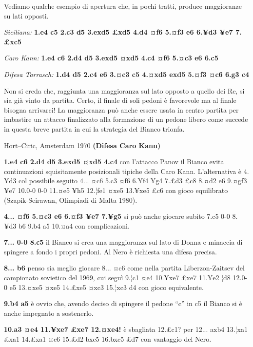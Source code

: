 Vediamo qualche esempio di apertura che, in pochi tratti, produce
maggioranze su lati opposti.

\emph{Siciliana:} \textbf{1.e4 c5 2.c3 d5 3.exd5 £xd5 4.d4 ¤f6 5.¤f3 e6
6.¥d3 ¥e7 7.£xc5}


\emph{Caro Kann:} \textbf{1.e4 c6 2.d4 d5 3.exd5 ¤xd5 4.c4 ¤f6 5.¤c3 e6
6.c5}


\emph{Difesa Tarrasch:} \textbf{1.d4 d5 2.c4 e6 3.¤c3 c5 4.¤xd5 exd5
5.¤f3 ¤c6 6.g3 c4}


Non si creda che, raggiunta una maggioranza sul lato opposto a quello
dei Re, si sia già vinto da partita. Certo, il finale di soli pedoni è
favorevole ma al finale bisogna arrivarci! La maggioranza può anche
essere usata in centro partita per imbastire un attacco finalizzato alla
formazione di un pedone libero come succede in questa breve partita in
cui la strategia del Bianco trionfa.

Hort--Ciric, Amsterdam 1970 \textbf{(Difesa Caro Kann)}

\textbf{1.e4 c6 2.d4 d5 3.exd5 ¤xd5 4.c4} con l'attacco Panov il Bianco
evita continuazioni squisitamente posizionali tipiche della Caro Kann.
L'alternativa è 4.¥d3 col possibile seguito 4... ¤c6 5.c3 ¤f6 6.¥f4 ¥g4
7.£d3 £c8 8.¤d2 e6 9.¤gf3 ¥e7 10.0-0 0-0 11.¤e5 ¥h5 12.¦fe1 ¤xe5 13.¥xe5
£c6 con gioco equilibrato (Szapik-Seirawan, Olimpiadi di Malta 1980).

\textbf{4... ¤f6 5.¤c3 e6 6.¤f3 ¥e7 7.¥g5} si può anche giocare subito
7.c5 0-0 8.¥d3 b6 9.b4 a5 10.¤a4 con complicazioni.

\textbf{7... 0-0 8.c5} il Bianco si crea una maggioranza sul lato di
Donna e minaccia di spingere a fondo i propri pedoni. Al Nero è
richiesta una difesa precisa.

\textbf{8... b6} penso sia meglio giocare 8... ¤c6 come nella partita
Liberzon-Zaitsev del campionato sovietico del 1969, cui seguì 9.¦c1 ¤e4
10.¥xe7 £xe7 11.¥e2 ¦d8 12.0-0 e5 13.¤xe5 ¤xe5 14.£xe5 ¤xc3 15.¦xc3 d4
con gioco equivalente.

\textbf{9.b4 a5} è ovvio che, avendo deciso di spingere il pedone ``c''
in c5 il Bianco si è anche impegnato a sostenerlo.

\textbf{10.a3 ¤e4 11.¥xe7 £xe7 12.¤xe4!} è sbagliata 12.£c1? per 12...
axb4 13.¦xa1 £xa1 14.£xa1 ¤c6 15.£d2 bxc5 16.bxc5 £d7 con vantaggio del
Nero.

